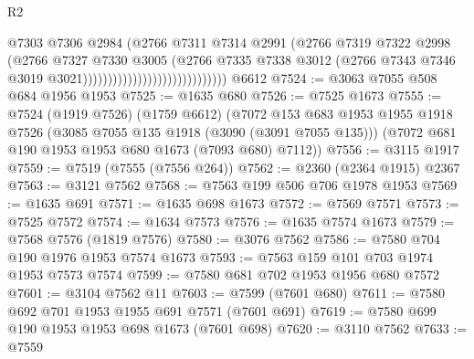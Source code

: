 \begin{lexlean}{R2}
\begin{coremodule}
                                                    @7303
                                                    @7306
                                                    @2984
                                                    (@2766
                                                      @7311
                                                      @7314
                                                      @2991
                                                      (@2766
                                                        @7319
                                                        @7322
                                                        @2998
                                                        (@2766
                                                          @7327
                                                          @7330
                                                          @3005
                                                          (@2766
                                                            @7335
                                                            @7338
                                                            @3012
                                                            (@2766
                                                              @7343
                                                              @7346
                                                              @3019
                                                              @3021)))))))))))))))))))))))))))))
    @6612
@7524 := @3063 @7055 @508 @684 @1956 @1953
@7525 := @1635 @680
@7526 := @7525 @1673
@7555 := @7524
    (@1919 @7526)
    (@1759 @6612)
    (@7072
      @153
      @683
      @1953
      @1955
      @1918
      @7526
      (@3085 @7055 @135 @1918 (@3090 (@3091 @7055 @135)))
      (@7072 @681 @190 @1953 @1953 @680 @1673 (@7093 @680) @7112))
@7556 := @3115 @1917
@7559 := @7519 (@7555 (@7556 @264))
@7562 := @2360 (@2364 @1915) @2367
@7563 := @3121 @7562
@7568 := @7563 @199 @506 @706 @1978 @1953
@7569 := @1635 @691
@7571 := @1635 @698 @1673
@7572 := @7569 @7571
@7573 := @7525 @7572
@7574 := @1634 @7573
@7576 := @1635 @7574 @1673
@7579 := @7568 @7576 (@1819 @7576)
@7580 := @3076 @7562
@7586 := @7580 @704 @190 @1976 @1953 @7574 @1673
@7593 := @7563 @159 @101 @703 @1974 @1953 @7573 @7574
@7599 := @7580 @681 @702 @1953 @1956 @680 @7572
@7601 := @3104 @7562 @11
@7603 := @7599 (@7601 @680)
@7611 := @7580 @692 @701 @1953 @1955 @691 @7571 (@7601 @691)
@7619 := @7580 @699 @190 @1953 @1953 @698 @1673 (@7601 @698)
@7620 := @3110 @7562
@7633 := @7559

\end{coremodule}
\end{lexlean}
